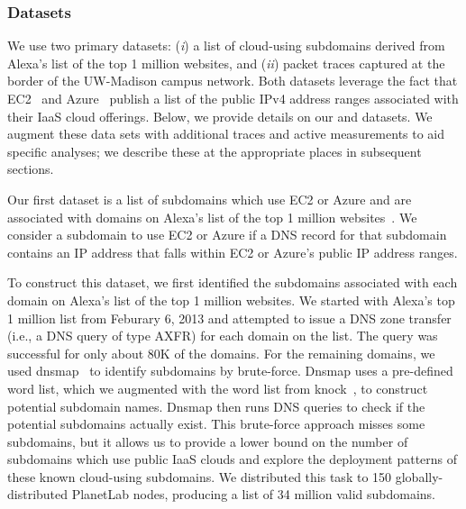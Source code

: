\subsubsection{Datasets}
\label{cloud-measure-datasets}

We use two primary datasets: ({\em i}) a list of cloud-using
subdomains derived from Alexa's list of the top 1 million websites,
and ({\em ii}) packet traces captured at the border of the
UW-Madison campus network. Both datasets leverage the fact that EC2~\cite{ec2iprange}
and Azure~\cite{azureiprange} publish a list of the public IPv4
address ranges associated with their IaaS cloud offerings. Below, we
provide details on our \alexadata and \capturedata datasets. We
augment these data sets with additional traces and active measurements
to aid specific analyses; we describe these at the appropriate places
in subsequent sections.


Our first dataset is a list of subdomains which use EC2 or Azure and are 
associated with domains on Alexa's list of the top 1 million
websites~\cite{alex_topdomains}. We consider a subdomain to use EC2 or Azure if a
DNS record for that subdomain contains an IP address that falls within EC2 or
Azure's public IP address ranges. 

To construct this dataset, we first identified the subdomains associated with
each domain on Alexa's list of the top 1 million websites.  We started
with Alexa's top 1 million list from Feburary 6, 2013 and attempted to issue
a DNS zone transfer (i.e., a DNS query of type AXFR) for each domain on the
list.  The query was successful for only about 80K of the domains.  For the
remaining domains, we used dnsmap~\cite{dnsmap} to identify subdomains by
brute-force. Dnsmap uses a pre-defined word list, which we augmented with the
word list from knock~\cite{knock}, to construct potential subdomain names.
Dnsmap then runs DNS queries to check if the potential subdomains actually 
exist. This brute-force approach misses some subdomains,
but it allows us to provide a lower bound on the number of subdomains which 
use public IaaS clouds and explore the deployment patterns of these known 
cloud-using subdomains.
We distributed this task to 150 globally-distributed PlanetLab
nodes, producing a list of 34 million valid subdomains.

